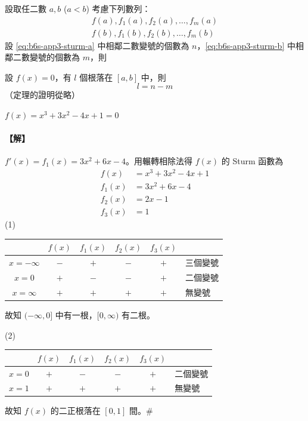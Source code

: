 設取任二數 $a, b$ ($a < b$) 考慮下列數列：
\begin{align}
f(a), f_1(a), f_2(a), \dots, f_m(a) \label{eq:b6s-app3-sturm-a} \\
f(b), f_1(b), f_2(b), \dots, f_m(b) \label{eq:b6s-app3-sturm-b}
\end{align}
設 \eqref{eq:b6s-app3-sturm-a} 中相鄰二數變號的個數為 $n$，\eqref{eq:b6s-app3-sturm-b} 中相鄰二數變號的個數為 $m$，則

\begin{theorem}[Sturm 定理]\label{thm:b6s-app3-sturm}
設 $f(x)=0$，有 $l$ 個根落在 $[a, b]$ 中，則
\[ l = n - m \]
（定理的證明從略）
\end{theorem}

\begin{example}\label{ex:b6s-app3-3}
$f(x) = x^3 + 3x^2 - 4x + 1 = 0$
\end{example}

\paragraph{【解】}
$f'(x) = f_1(x) = 3x^2 + 6x - 4$。用輾轉相除法得 $f(x)$ 的 Sturm 函數為
\begin{align*}
f(x) &= x^3 + 3x^2 - 4x + 1 \\
f_1(x) &= 3x^2 + 6x - 4 \\
f_2(x) &= 2x - 1 \\
f_3(x) &= 1
\end{align*}
(1)
\begin{center}
\renewcommand{\arraystretch}{1.3}
\begin{tabular}{c|c|c|c|c|l}
& $f(x)$ & $f_1(x)$ & $f_2(x)$ & $f_3(x)$ & \\
\hline
$x = -\infty$ & $-$ & $+$ & $-$ & $+$ & 三個變號 \\
$x = 0$       & $+$ & $-$ & $-$ & $+$ & 二個變號 \\
$x = \infty$  & $+$ & $+$ & $+$ & $+$ & 無變號
\end{tabular}
\end{center}
故知 $(-\infty, 0]$ 中有一根，$[0, \infty)$ 有二根。

(2)
\begin{center}
\renewcommand{\arraystretch}{1.3}
\begin{tabular}{c|c|c|c|c|l}
& $f(x)$ & $f_1(x)$ & $f_2(x)$ & $f_3(x)$ & \\
\hline
$x = 0$ & $+$ & $-$ & $-$ & $+$ & 二個變號 \\
$x = 1$ & $+$ & $+$ & $+$ & $+$ & 無變號
\end{tabular}
\end{center}
故知 $f(x)$ 的二正根落在 $[0, 1]$ 間。\hfill$\#$
